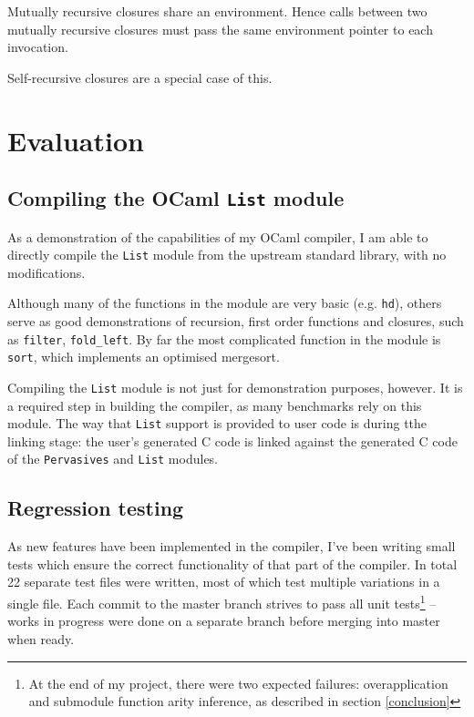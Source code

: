 \documentclass[12pt,a4paper,twoside,openright]{report}
\begin{document}
Mutually recursive closures share an environment. Hence calls between two
mutually recursive closures must pass the same environment pointer to each
invocation.

Self-recursive closures are a special case of this.



\chapter{Evaluation}

\section{Compiling the OCaml \texttt{List} module}\label{module-list}

As a demonstration of the capabilities of my OCaml compiler, I am able to
directly compile the \lstinline!List! module from the upstream standard
library, with no modifications.

Although many of the functions in the module are very basic (e.g.
\lstinline!hd!), others serve as good demonstrations of recursion, first order
functions and closures, such as \lstinline!filter!, \lstinline!fold_left!. By
far the most complicated function in the module is \lstinline!sort!, which
implements an optimised mergesort.

Compiling the \lstinline!List! module is not just for demonstration purposes,
however. It is a required step in building the compiler, as many benchmarks
rely on this module. The way that \lstinline!List! support is provided to user
code is during tthe linking stage: the user's generated C code is linked
against the generated C code of the \lstinline!Pervasives! and \lstinline!List!
modules.

\section{Regression testing}

As new features have been implemented in the compiler, I've been writing small
tests which ensure the correct functionality of that part of the compiler. In
total 22 separate test files were written, most of which test multiple
variations in a single file. Each commit to the master branch strives to pass
all unit tests\footnote{At the end of my project, there were two expected
  failures: overapplication and submodule function arity inference, as
  described in section \ref{conclusion}}
-- works in progress were done on a separate branch before merging into master
when ready.
\end{document}
